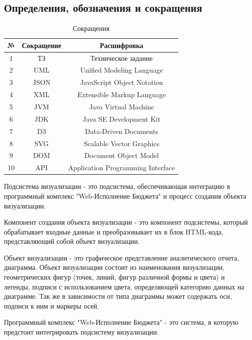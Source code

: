 \documentclass[a4paper]{extarticle}
\numberwithin{equation}{section}
\begin{document}
\subsection*{Определения, обозначения и сокращения}
\begin{table}[H]
\caption{Сокращения}
  \begin{tabular}{|c|c|c|}
  \hline
  №  & Сокращение & Расшифровка \\\hline
  1  & ТЗ   & Техническое задание \\\hline
  2  & UML  & Unified Modeling Language \\\hline
  3  & JSON & JavaScript Object Notation \\\hline
  4  & XML  & Extensible Markup Language \\\hline
  5  & JVM  & Java Virtual Machine \\\hline
  6  & JDK  & Java SE Development Kit \\\hline
  7  & D3   & Data-Driven Documents \\\hline
  8  & SVG  & Scalable Vector Graphics \\\hline
  9  & DOM  & Document Object Model \\\hline
  10 & API  & Application Programming Interface \\
  \hline
  \end{tabular}
\end{table}\par
Подсистема визуализации - это подсистема, обеспечивающая интеграцию в программный комплекс "Web-Исполнение Бюджета" и процесс создания объекта визуализации.\par
Компонент создания объекта визуализации - это компонент подсистемы, который обрабатывает входные данные и преобразовывает их в блок HTML-кода, представляющий собой объект визуализации.\par
Объект визуализации - это графическое представление аналитического отчета, диаграмма. Объект визуализации состоит из наименования визуализации, геометрических фигур (точек, линий, фигур различной формы и цвета) и легенды, подписи с использованием цвета, определяющей категорию данных на диаграмме. Так же в зависимости от типа диаграммы может содержать оси, подписи к ним и маркеры осей.\par
Программный комплекс "Web-Исполнение Бюджета" - это система, в которую предстоит интегрировать подсистему визуализации.\par
\end{document}
